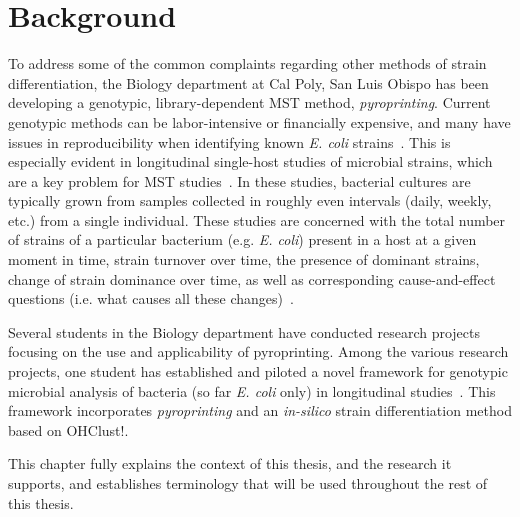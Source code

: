 \documentclass[12pt]{ucthesis}
\begin{document}
\chapter{Background}\label{chap:background}
   To address some of the common complaints regarding other methods of strain
   differentiation, the Biology department at Cal Poly, San Luis Obispo has
   been developing a genotypic, library-dependent MST method,
   \textit{pyroprinting}. Current genotypic methods can be labor-intensive or
   financially expensive, and many have issues in reproducibility when
   identifying known \textit{E. coli} strains~\cite{Gordon:StrainTyping,
   Scott:CurrentMST, Simpson:StateOf}. This is especially evident in
   longitudinal single-host studies of microbial strains, which are a key
   problem for MST studies~\cite{Simpson:StateOf, Anderson:Diversity,
   Schlager:Clonal}. In these studies, bacterial cultures are typically grown
   from samples collected in roughly even intervals (daily, weekly, etc.) from
   a single individual. These studies are concerned with the total number of
   strains of a particular bacterium (e.g. \textit{E. coli}) present in a host
   at a given moment in time, strain turnover over time, the presence of
   dominant strains, change of strain dominance over time, as well as
   corresponding cause-and-effect questions (i.e. what causes all these
   changes)~\cite{Anderson:Diversity, Caugant:Diverse, Sears:Persist,
   Simpson:StateOf}.
   
   Several students in the Biology department have conducted research projects
   focusing on the use and applicability of pyroprinting. Among the various
   research projects, one student has established and piloted a novel framework
   for genotypic microbial analysis of bacteria (so far \textit{E. coli} only)
   in longitudinal studies~\cite{Montana:ChronoCluster, Montana:CRC}. This
   framework incorporates \textit{pyroprinting} and an \textit{in-silico}
   strain differentiation method based on OHClust!.

   This chapter fully explains the context of this thesis, and the research it
   supports, and establishes terminology that will be used throughout the rest
   of this thesis.
\end{document}
